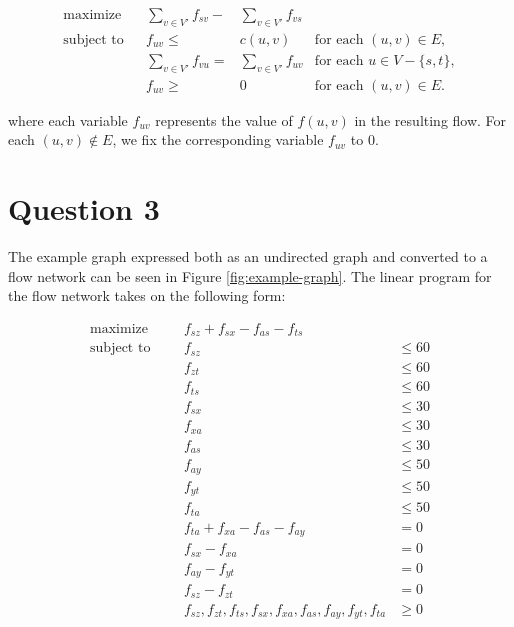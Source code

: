 \documentclass[a4paper, 10pt, oneside, article]{memoir}
\begin{document}
\begin{align*}
  \text{maximize} && \sum_{v\in V'} f_{sv} -{}& \sum_{v\in V'} f_{vs} \\
  \text{subject to} && f_{uv} \leq{}& c(u,v) & \text{for each $(u,v) \in E$}, \\
                    && \sum_{v \in V'} f_{vu} ={}& \sum_{v \in V'} f_{uv} & \text{for each $u \in V - \{s, t \}$}, \\
                    && f_{uv} \geq{}& 0 & \text{for each $(u, v) \in E$}.
\end{align*}

where each variable $f_{uv}$ represents the value of $f(u,v)$ in the
resulting flow. For each $(u,v) \not\in E$, we fix the corresponding
variable $f_{uv}$ to 0.


\section*{Question 3}

The example graph expressed both as an undirected graph and converted
to a flow network can be seen in Figure \ref{fig:example-graph}. The
linear program for the flow network takes on the following form:

\begin{align*}
  \text{maximize}   &&& f_{sz} + f_{sx} - f_{as} - f_{ts} \\
  \text{subject to} &&& f_{sz} &\leq 60 \\
                    &&& f_{zt} &\leq 60 \\
                    &&& f_{ts} &\leq 60 \\
                    &&& f_{sx} &\leq 30 \\
                    &&& f_{xa} &\leq 30 \\
                    &&& f_{as} &\leq 30 \\
                    &&& f_{ay} &\leq 50 \\
                    &&& f_{yt} &\leq 50 \\
                    &&& f_{ta} &\leq 50 \\
                    &&& f_{ta} + f_{xa}  - f_{as} - f_{ay} &= 0 \\
                    &&& f_{sx} - f_{xa} &= 0 \\
                    &&& f_{ay} - f_{yt} &= 0 \\
                    &&& f_{sz} - f_{zt} &= 0 \\
                    &&& f_{sz}, f_{zt}, f_{ts}, f_{sx}, f_{xa}, f_{as}, f_{ay}, f_{yt}, f_{ta} &\geq 0
\end{align*}
\end{document}
